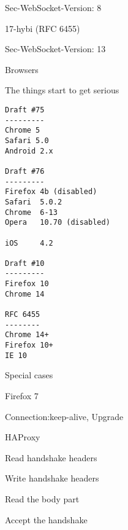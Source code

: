 \documentclass[14pt]{beamer}
\begin{document}
\begin{frame}
    \begin{center}
    Sec-WebSocket-Version: 8
    \end{center}
\end{frame}

\begin{frame}
    \begin{center}
    17-hybi (RFC 6455)

    Sec-WebSocket-Version: 13
    \end{center}
\end{frame}

\begin{frame}
    \begin{center}
    Browsers

    The things start to get serious
    \end{center}
\end{frame}

\begin{frame}[fragile]
    \begin{lstlisting}
Draft #75
---------
Chrome 5
Safari 5.0
Android 2.x

Draft #76
---------
Firefox 4b (disabled)
Safari  5.0.2
Chrome  6-13
Opera   10.70 (disabled)

iOS     4.2

Draft #10
---------
Firefox 10
Chrome 14

RFC 6455
--------
Chrome 14+
Firefox 10+
IE 10
    \end{lstlisting}
\end{frame}

\begin{frame}
    \begin{center}
    Special cases
    \end{center}
\end{frame}

\begin{frame}
    \begin{center}
    Firefox 7

    Connection:keep-alive, Upgrade
    \end{center}
\end{frame}

\begin{frame}
    \begin{center}
    HAProxy

    Read handshake headers

    Write handshake headers

    Read the body part

    Accept the handshake
    \end{center}
\end{frame}
\end{document}
